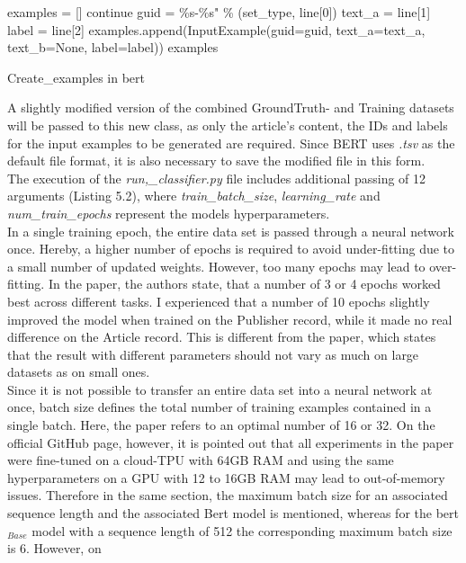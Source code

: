 \documentclass[a4paper, 11pt,titlepage,oneside,openany]{book}
\begin{document}
\begin{algorithm}[H]
	\DontPrintSemicolon
	examples = []\;
	{
		{
			continue
		}
		guid = \%s-\%s" \% (set\_type, line[0])\;
		text\_a = line[1]\;
		label = line[2]\;
		examples.append(InputExample(guid=guid, text\_a=text\_a, text\_b=None, label=label))\;
	}
	\Return examples
	\caption{Create\_examples in \gls{bert}}
\end{algorithm} 
A slightly modified version of the combined GroundTruth- and Training datasets will be passed to this new class, as only the article's content, the IDs and labels for the input examples to be generated are required. Since BERT uses \textit{.tsv} as the default file format, it is also necessary to save the modified file in this form. \\
\noindent The execution of the \textit{run,\_classifier.py} file includes additional passing of 12 arguments (Listing 5.2), where \textit{train\_batch\_size}, \textit{learning\_rate} and \textit{num\_train\_epochs} represent the models hyperparameters. \\
\indent In a  single training epoch, the entire data set is passed through a neural network once. Hereby, a higher number of epochs is required to avoid under-fitting due to a small number of updated weights. However, too many epochs may lead to over-fitting. In the paper, the authors state, that a number of  3 or 4 epochs worked best across different tasks. I experienced that a number of 10 epochs slightly improved the model when trained on the Publisher record, while it made no real difference on the Article record. This is different from the paper, which states that the result with different parameters should not vary as much on large datasets as on small ones.  \\
\indent Since it is not possible to transfer an entire data set into a neural network at once, batch size defines the total number of training examples contained in a single batch. Here, the paper refers  to an optimal number of 16 or 32. On the official GitHub page, however, it is pointed out that all experiments in the paper were fine-tuned on a cloud-TPU with 64GB RAM and using the same hyperparameters  on a GPU with 12 to 16GB RAM may lead to out-of-memory issues. Therefore in the same section, the maximum batch size for an associated sequence length and the associated Bert model is mentioned, whereas for the \gls{bert}$_{Base}$ model with a sequence length of 512 the corresponding maximum batch size is 6. However, on
\end{document}
